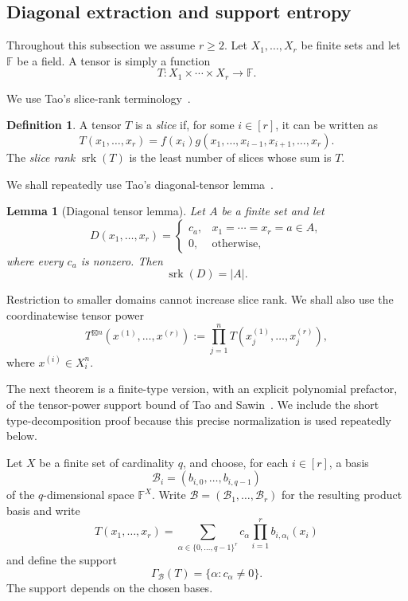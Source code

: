 \documentclass[10pt,a4paper]{amsart}
\newtheorem{lemma}[theorem]{Lemma}
\theoremstyle{definition}
\newtheorem{definition}[theorem]{Definition}
\newcommand{\F}{\mathbb F}
\newcommand{\srk}{\operatorname{srk}}
\newcommand{\boxt}{\boxtimes}
\newcommand{\1}{\mathbf 1}
\begin{document}
\subsection{Diagonal extraction and support entropy}
Throughout this subsection we assume $r\ge2$.  Let $X_1,\ldots,X_r$ be finite sets and let $\F$ be a field.  A tensor is simply a function
\[
 T:X_1\times\cdots\times X_r\longrightarrow\F.
\]

We use Tao's slice-rank terminology~\cite{TaoBlog,TaoSawin}.

\begin{definition}
A tensor $T$ is a \emph{slice} if, for some $i\in[r]$, it can be written as
\[
 T(x_1,\ldots,x_r)=f(x_i)g(x_1,\ldots,x_{i-1},x_{i+1},\ldots,x_r).
\]
The \emph{slice rank} $\srk(T)$ is the least number of slices whose sum is $T$.
\end{definition}

We shall repeatedly use Tao's diagonal-tensor lemma~\cite[Lemma~1]{TaoBlog}.

\begin{lemma}[Diagonal tensor lemma]\label{lem:diagonal}
Let $A$ be a finite set and let
\[
 D(x_1,\ldots,x_r)=
 \begin{cases}
 c_a,&x_1=\cdots=x_r=a\in A,\\
 0,&\text{otherwise},
 \end{cases}
\]
where every $c_a$ is nonzero.  Then
\[
 \srk(D)=|A|.
\]
\end{lemma}

{Restriction to smaller domains cannot increase slice rank.}  We shall also use the coordinatewise tensor power
\[
 T^{\boxt n}(x^{(1)},\ldots,x^{(r)})
 :=\prod_{j=1}^nT(x^{(1)}_j,\ldots,x^{(r)}_j),
\]
where $x^{(i)}\in X_i^n$.



The next theorem is a finite-type version, with an explicit polynomial prefactor, of the tensor-power support bound of Tao and Sawin~\cite[Proposition~6]{TaoSawin}.  We include the short type-decomposition proof because this precise normalization is used repeatedly below.

Let $X$ be a finite set of cardinality $q$, and choose, for each $i\in[r]$, a basis
\[
 \mathcal B_i=(b_{i,0},\ldots,b_{i,q-1})
\]
of the $q$-dimensional space $\F^X$.  Write $\mathcal B=(\mathcal B_1,\ldots,\mathcal B_r)$ for the resulting product basis and write
\[
 T(x_1,\ldots,x_r)
 =\sum_{\alpha\in\{0,\ldots,q-1\}^r}
 c_\alpha\prod_{i=1}^r b_{i,\alpha_i}(x_i)
\]
and define the support
\[
 \Gamma_{\mathcal B}(T)=\{\alpha:c_\alpha\ne0\}.
\]
The support depends on the chosen bases.
\end{document}
